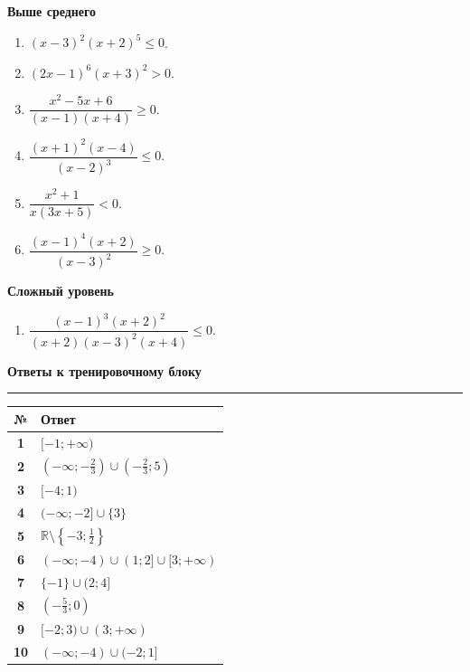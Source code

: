 \documentclass[a4paper,12pt]{article}
\newcommand{\sectiontitle}[1]{%
  \vspace{0.65em}
  {\Large\bfseries\textcolor{darkaccent}{#1}}\par
  \vspace{0.25em}
  {\color{accent}\rule{\linewidth}{0.5pt}}
  \vspace{0.45em}
}
\newcommand{\subsectiontitle}[1]{%
  \vspace{0.5em}
  {\large\bfseries\textcolor{darkaccent}{#1}}\par
  \vspace{0.2em}
}
\newcommand{\R}{\mathbb{R}}
\begin{document}
\subsectiontitle{Выше среднего}
\begin{enumerate}[label=\textbf{\arabic*.},start=4]
  \item $(x-3)^2(x+2)^5\le0$.
  \item $(2x-1)^6(x+3)^2>0$.
  \item $\dfrac{x^2-5x+6}{(x-1)(x+4)}\ge0$.
  \item $\dfrac{(x+1)^2(x-4)}{(x-2)^3}\le0$.
  \item $\dfrac{x^2+1}{x(3x+5)}<0$.
  \item $\dfrac{(x-1)^4(x+2)}{(x-3)^2}\ge0$.
\end{enumerate}

\subsectiontitle{Сложный уровень}
\begin{enumerate}[label=\textbf{\arabic*.},start=10]
  \item $\dfrac{(x-1)^3(x+2)^2}{(x+2)(x-3)^2(x+4)}\le0$.
\end{enumerate}

\newpage
\sectiontitle{Ответы к тренировочному блоку}

\begin{center}
\renewcommand{\arraystretch}{1.5}
\begin{tabularx}{\linewidth}{@{}>{\bfseries}c X@{}}
\toprule
№ & Ответ \\
\midrule
1 & $[-1;+\infty)$ \\
2 & $(-\infty;-\frac23)\cup(-\frac23;5)$ \\
3 & $[-4;1)$ \\
4 & $(-\infty;-2]\cup\{3\}$ \\
5 & $\R\setminus\left\{-3;\frac12\right\}$ \\
6 & $(-\infty;-4)\cup(1;2]\cup[3;+\infty)$ \\
7 & $\{-1\}\cup(2;4]$ \\
8 & $\left(-\frac53;0\right)$ \\
9 & $[-2;3)\cup(3;+\infty)$ \\
10 & $(-\infty;-4)\cup(-2;1]$ \\
\bottomrule
\end{tabularx}
\end{center}
\end{document}
